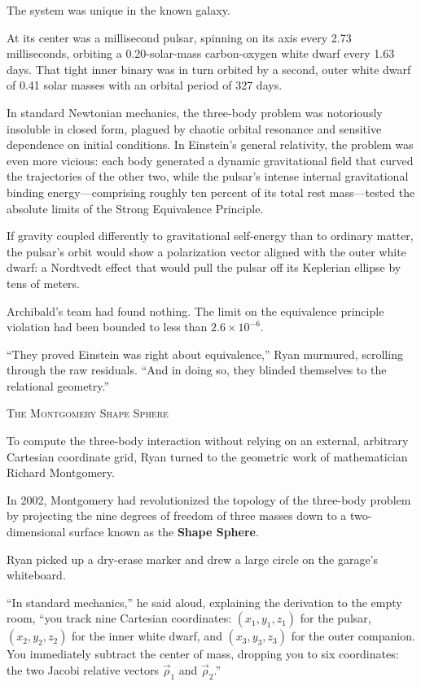 \documentclass[12pt,twoside,openright]{book}
\newcommand{\sceneheader}[1]{%
  \par\vspace{1.8em}%
  {\noindent\centering\scshape\large #1\par}%
  \vspace{1.0em}%
  \noindent%
}
\newcommand{\dinkus}{%
  \par\vspace{1.2em}%
  {\noindent\centering{\large $\ast\quad\ast\quad\ast$}\par}%
  \vspace{1.2em}%
  \noindent%
}
\begin{document}
The system was unique in the known galaxy.

At its center was a millisecond pulsar, spinning on its axis every 2.73
milliseconds, orbiting a 0.20-solar-mass carbon-oxygen white dwarf every
1.63 days. That tight inner binary was in turn orbited by a second,
outer white dwarf of 0.41 solar masses with an orbital period of 327
days.

In standard Newtonian mechanics, the three-body problem was notoriously
insoluble in closed form, plagued by chaotic orbital resonance and
sensitive dependence on initial conditions. In Einstein's general
relativity, the problem was even more vicious: each body generated a
dynamic gravitational field that curved the trajectories of the other
two, while the pulsar's intense internal gravitational binding
energy---comprising roughly ten percent of its total rest mass---tested
the absolute limits of the Strong Equivalence Principle.

If gravity coupled differently to gravitational self-energy than to
ordinary matter, the pulsar's orbit would show a polarization vector
aligned with the outer white dwarf: a Nordtvedt effect that would pull
the pulsar off its Keplerian ellipse by tens of meters.

Archibald's team had found nothing. The limit on the equivalence
principle violation had been bounded to less than
\(2.6 \times 10^{-6}\).

``They proved Einstein was right about equivalence,'' Ryan murmured,
scrolling through the raw residuals. ``And in doing so, they blinded
themselves to the relational geometry.''

\dinkus

\sceneheader{The Montgomery Shape
Sphere}

To compute the three-body interaction without relying on an external,
arbitrary Cartesian coordinate grid, Ryan turned to the geometric work
of mathematician Richard Montgomery.

In 2002, Montgomery had revolutionized the topology of the three-body
problem by projecting the nine degrees of freedom of three masses down
to a two-dimensional surface known as the \textbf{Shape Sphere}.

Ryan picked up a dry-erase marker and drew a large circle on the
garage's whiteboard.

``In standard mechanics,'' he said aloud, explaining the derivation to
the empty room, ``you track nine Cartesian coordinates:
\((x_1, y_1, z_1)\) for the pulsar, \((x_2, y_2, z_2)\) for the inner
white dwarf, and \((x_3, y_3, z_3)\) for the outer companion. You
immediately subtract the center of mass, dropping you to six
coordinates: the two Jacobi relative vectors \(\vec{\rho}_1\) and
\(\vec{\rho}_2\).''
\end{document}
